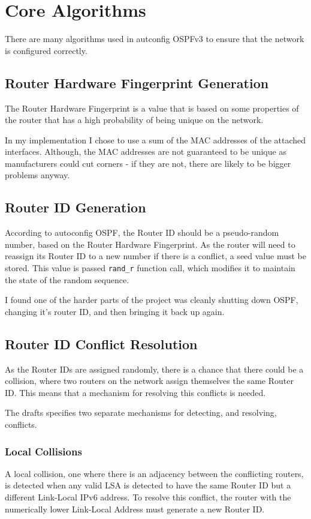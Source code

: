 \documentclass[12pt]{report}
\begin{document}
\section{Core Algorithms}
There are many algorithms used in autconfig OSPFv3 to ensure that the network
is configured correctly.

\subsection{Router Hardware Fingerprint Generation}
The Router Hardware Fingerprint is a value that is based on some properties of
the router that has a high probability of being unique on the network. 

In my implementation I chose to use a sum of the MAC  addresses of the attached interfaces.
Although, the MAC addresses are not guaranteed to be unique as manufacturers
could cut corners - if they are not, there are likely to be bigger problems
anyway.

\subsection{Router ID Generation}
According to autoconfig OSPF, the Router ID should be a pseudo-random number,
based on the Router Hardware Fingerprint. As the router will need to reassign
its Router ID to a new number if there is a conflict, a seed value must be
stored. This value is passed \texttt{rand\_r} function call, which modifies it to
maintain the state of the random sequence.

I found one of the harder parts of the project was cleanly shutting down OSPF,
changing it's router ID, and then bringing it back up again. 

\subsection{Router ID Conflict Resolution}
As the Router IDs are assigned randomly, there is a chance that there could be
a collision, where two routers on the network assign themselves the same Router
ID\@.  This means that a mechanism for resolving this conflicts is needed. 

The drafts specifies two separate mechanisms for detecting, and resolving,
conflicts. 

\subsubsection{Local Collisions}
A local collision, one where there is an adjacency between the conflicting
routers, is detected when any valid LSA is detected to have the same Router ID
but a different Link-Local IPv6 address. To resolve this conflict, the router
with the numerically lower Link-Local Address must generate a new Router ID\@. 
\end{document}
